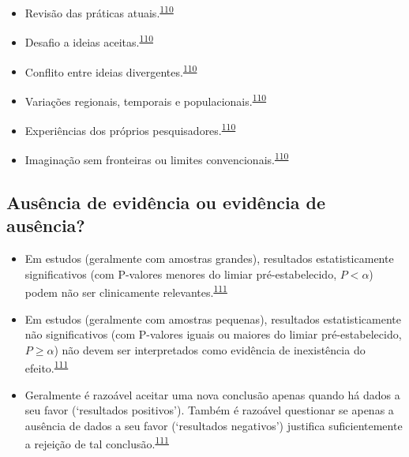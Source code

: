 \documentclass[
  a4paper,
]{book}
\begin{document}
\begin{itemize}
\item
  Revisão das práticas atuais.\textsuperscript{\protect\hyperlink{ref-Vandenbroucke2018}{110}}
\item
  Desafio a ideias aceitas.\textsuperscript{\protect\hyperlink{ref-Vandenbroucke2018}{110}}
\item
  Conflito entre ideias divergentes.\textsuperscript{\protect\hyperlink{ref-Vandenbroucke2018}{110}}
\item
  Variações regionais, temporais e populacionais.\textsuperscript{\protect\hyperlink{ref-Vandenbroucke2018}{110}}
\item
  Experiências dos próprios pesquisadores.\textsuperscript{\protect\hyperlink{ref-Vandenbroucke2018}{110}}
\item
  Imaginação sem fronteiras ou limites convencionais.\textsuperscript{\protect\hyperlink{ref-Vandenbroucke2018}{110}}
\end{itemize}

\hypertarget{ausuxeancia-de-eviduxeancia-ou-eviduxeancia-de-ausuxeancia}{%
\subsection{Ausência de evidência ou evidência de ausência?}\label{ausuxeancia-de-eviduxeancia-ou-eviduxeancia-de-ausuxeancia}}

\begin{itemize}
\item
  Em estudos (geralmente com amostras grandes), resultados estatisticamente significativos (com P-valores menores do limiar pré-estabelecido, \(P<\alpha\)) podem não ser clinicamente relevantes.\textsuperscript{\protect\hyperlink{ref-altman1995}{111}}
\item
  Em estudos (geralmente com amostras pequenas), resultados estatisticamente não significativos (com P-valores iguais ou maiores do limiar pré-estabelecido, \(P≥\alpha\)) não devem ser interpretados como evidência de inexistência do efeito.\textsuperscript{\protect\hyperlink{ref-altman1995}{111}}
\item
  Geralmente é razoável aceitar uma nova conclusão apenas quando há dados a seu favor (`resultados positivos'). Também é razoável questionar se apenas a ausência de dados a seu favor (`resultados negativos') justifica suficientemente a rejeição de tal conclusão.\textsuperscript{\protect\hyperlink{ref-altman1995}{111}}
\end{itemize}
\end{document}

